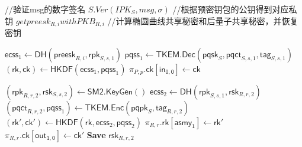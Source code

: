 \begin{definition}[多阶段密钥交换协议]
\begin{itemize}
    \begin{algorithm}[H]
    \caption{$\mathsf{SessionStart_R}(\pi_{R,r}, IPK_S, PKB_{R,i}, msg,\sigma)$}
    \label{alg:asym_ratchet}
    \begin{algorithmic}[1]
        \State //验证msg的数字签名
        \State $S.Ver(IPK_S, msg, \sigma)$
        \State //根据预密钥包的公钥得到对应私钥
        \State $get preesk_{R,i} with PKB_{R,i}$
        \State //计算椭圆曲线共享秘密和后量子共享秘密，并恢复密钥

        \State $\mathsf{ecss}_1 \gets \mathsf{DH}(\mathsf{preesk}_{R,i}, \mathsf{rpk}_{S,s,1})$
        \State $\mathsf{pqss}_1 \gets \mathsf{TKEM}.\mathsf{Dec}(\mathsf{pqsk}_{S}, \mathsf{pqct}_{S,s,1}, \mathsf{tag}_{S,s,1})$
        \State $(\mathsf{rk}, \mathsf{ck}) \gets \mathsf{HKDF}(\mathsf{ecss}_1, \mathsf{pqss}_1)$
        \State $\pi_{P,p}.\mathsf{ck}[\mathsf{in_{0, 0}}] \gets \mathsf{ck}$ 

        \State $(\mathsf{rpk}_{R,r,2}, \mathsf{rsk}_{S,s,2}) \gets \mathsf{SM2}.\mathsf{KeyGen}()$
        \State $\mathsf{ecss}_{2} \gets \mathsf{DH}(\mathsf{rpk}_{S,s,1}, \mathsf{rsk}_{R,r,2})$ 
        \State $(\mathsf{pqct}_{R,r,2}, \mathsf{pqss}_{1}) \gets \mathsf{TKEM}.\mathsf{Enc}(\mathsf{pqpk}_{S}, \mathsf{tag}_{R,r,2})$
        \State $(\mathsf{rk'}, \mathsf{ck'}) \gets \mathsf{HKDF}(\mathsf{rk}, \mathsf{ecss}_{2}, \mathsf{pqss}_{2})$ 
        \State $\pi_{R, r}.\mathsf{rk}[\mathsf{asmy_1}] \gets \mathsf{rk'}$ 
        \State $\pi_{R,r}.\mathsf{ck}[\mathsf{out_{1, 0}}] \gets \mathsf{ck'}$ 
        \State \textbf{Save} $\mathsf{rsk}_{R,r,2}$ 
    \end{algorithmic}
    \end{algorithm}
    
    
 




\end{itemize}
\end{definition}
